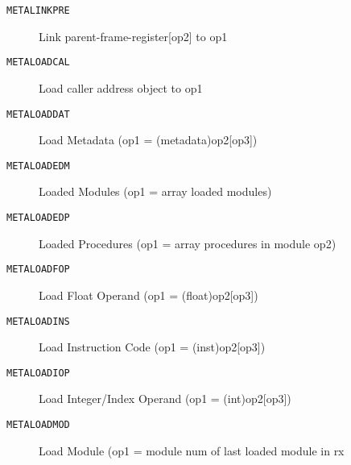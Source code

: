 \begin{description}
\item[\texttt{METALINKPRE}]    Link parent-frame-register[op2] to op1\\

\end{description}
\begin{description}
\item[\texttt{METALOADCAL}]          Load caller address object to op1\\

\end{description}
\begin{description}
\item[\texttt{METALOADDAT}]    Load Metadata (op1 = (metadata)op2[op3])\\

\end{description}
\begin{description}
\item[\texttt{METALOADEDM}]         Loaded Modules (op1 = array loaded modules)\\

\end{description}
\begin{description}
\item[\texttt{METALOADEDP}]       Loaded Procedures (op1 = array procedures in module op2)\\

\end{description}
\begin{description}
\item[\texttt{METALOADFOP}]        Load Float Operand (op1 = (float)op2[op3])\\

\end{description}
\begin{description}
\item[\texttt{METALOADINS}]    Load Instruction Code (op1 = (inst)op2[op3])\\

\end{description}
\begin{description}
\item[\texttt{METALOADIOP}]        Load Integer/Index Operand (op1 = (int)op2[op3])\\

\end{description}
\begin{description}
\item[\texttt{METALOADMOD}]      Load Module (op1 = module num of last loaded module in rx\\

\end{description}
